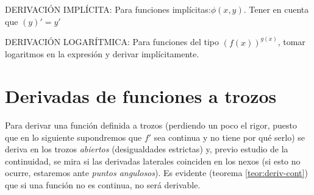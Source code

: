 	\vspace {5mm}
	
	DERIVACIÓN IMPLÍCITA:  Para funciones implícitas:$\phi(x,y)$. Tener en cuenta que $(y)'=y'$
	
	\vspace {5mm}
	
	DERIVACIÓN LOGARÍTMICA: Para funciones del tipo $(f(x))^{g(x)}$, tomar logaritmos en la expresión y derivar implícitamente.

\section{Derivadas de funciones a trozos}
	
	Para derivar una función definida a trozos (perdiendo un poco el rigor, puesto que en lo siguiente supondremos que $f'$ sea continua y no tiene por qué serlo) se deriva en los trozos \textit{abiertos} (desigualdades estrictas) y, previo estudio de la continuidad, se mira si las derivadas laterales coinciden en los nexos (si esto no ocurre, estaremos ante \textit{puntos angulosos}). Es evidente (teorema \ref{teor:deriv-cont}) que si una función no es continua, no será derivable.
	

